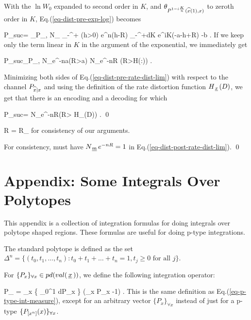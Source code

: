 \documentclass[12pt]{article}
\begin{document}
With the $\ln W_0$
 expanded to second order in $K$,
 and $\theta_{P^{1-i\frac{K}{n}}({\widehat{x}}(1), x)}$
 to zeroth order in $K$,
Eq.(\ref{eq-dist-pre-exp-log}) becomes

\beq
P_{suc}=
\theta_{P_{\what{\rvx}, \rvx}} N_\rvm
\int_{-\infty}^{+\infty}\;
\theta(h>0)
e^{n(h-R)}
\int_{-\infty}^{+\infty}dK\;
e^{iK(-a-h+R) -b}
\;.
\eeq
If we keep only the term
linear in $K$ in the argument
of the exponential, we immediately get

\beq
P_{suc}\approx \theta_{P_{\what{\rvx}, \rvx}}
N_\rvm e^{-na}\theta(R>a)
\approx
N_\rvm e^{-nR}
\theta(R>H(\what{\rvx}:\rvx))
\;.
\label{eq-dist-pre-rate-dist-lim}
\eeq

Minimizing both sides of
Eq.(\ref{eq-dist-pre-rate-dist-lim})
with respect to the channel $P_{{\widehat{x}}|x}$
and using
the definition of the rate
distortion function $H_{\,\underline{x}\,}(D)$,
we get
that there is an encoding and a decoding
for which


\beq
P_{suc}= N_\rvm e^{-nR}\theta(R> H_\rvx(D))
\;.
\label{eq-dist-post-rate-dist-lim}
\eeq
\qed

\begin{claim}
\beq
R = R_\rvm
\;
\eeq
for consistency of our arguments.
\end{claim}
\proof
For consistency, must have
$N_{\,\underline{m}\,} e^{-nR}=1$
in Eq.(\ref{eq-dist-post-rate-dist-lim}).
\qed




\appendix
\section{Appendix: Some Integrals Over Polytopes}


This appendix
is a collection of
integration formulas
for doing
integrals
over polytope shaped regions. These
formulas are
useful for doing p-type integrations.

The standard polytope
is defined as the
set
$\Delta^n = \{(t_0, t_1, \ldots, t_n):
t_0 + t_1 + \ldots +t_n = 1, t_j\geq 0\mbox{ for all } j\}$.

For $\{P_x\}_{\forall x} \in pd(val({\,\underline{x}\,}))$,
we define the following  integration operator:

\beq
\int \cald P_\rvx
=
\prod_x
\left\{
\int_0^1 dP_x
\right\}
\delta\left(\sum_x P_x -1\right)
\;.
\eeq
This is the same definition as
Eq.(\ref{eq-p-type-int-measure}),
except for an
arbitrary vector
$\{P_x\}_{\forall x}$
instead of just
for a p-type
$\{{P_{[x^n]} }(x)\}_{\forall x}$.
\end{document}
